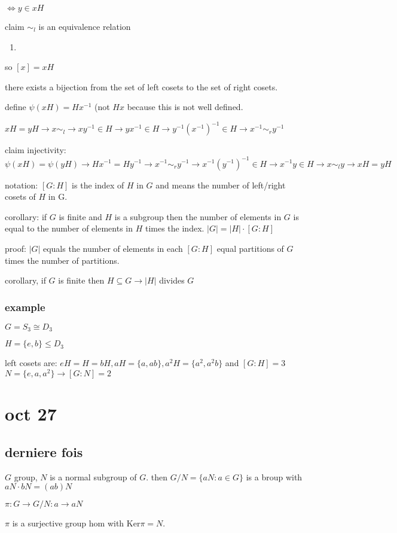 \documentclass[letterpaper]{article}
\begin{document}
$\Leftrightarrow y\in xH$

claim $\sim_l$ is an equivalence relation
\begin{enumerate}
\item

\end{enumerate}
so $[x]=xH$

there exists a bijection from the set of left cosets to the set of right cosets.

define $\psi(xH)=Hx^{-1}$ (not $Hx$ because this is not well defined.

$xH=yH\to x\sim_l\to xy^{-1}\in H\to yx^{-1}\in H\to y^{-1}(x^{-1})^{-1}\in H\to x^{-1}\sim_r y^{-1}$

claim injectivity:$\psi(xH)=\psi(yH)\to Hx^{-1}=Hy^{-1}\to x^{-1}\sim_ry^{-1}\to x^{-1}(y^{-1})^{-1}\in H\to x^{-1}y\in H\to x\sim_l y\to xH=yH$

notation:  $[G:H]$ is the index of $H$ in $G$ and means the number of left/right cosets of $H$ in G.

corollary: if $G$ is finite and $H$ is a subgroup then the number of elements in $G$ is equal to the number of elements in $H$ times the index. $|G|=|H|\cdot[G:H]$

proof: $|G|$ equals the number of elements in each $[G:H]$ equal partitions of $G$ times the number of partitions.

corollary, if $G$ is finite then $H\subseteq G\to |H|$ divides $G$

\subsubsection*{example}
$G=S_3\cong D_3$

$H=\{e,b\}\le D_3$

left cosets are: $eH=H=bH, aH=\{a,ab\}, a^2H=\{a^2,a^2b\}$ and $[G:H]=3$
$N=\{e,a,a^{2}\}\to [G:N]=2$
\section*{oct 27}
\subsection*{derniere fois}
$G$ group, $N$ is a normal subgroup of $G$. then $G/N=\{aN:a\in G\}$ is a broup with $aN\cdot bN=(ab)N$

$\pi:G\to G/N:a\to aN$

$\pi$ is a surjective group hom with $\text{Ker} \pi=N$.
\end{document}
